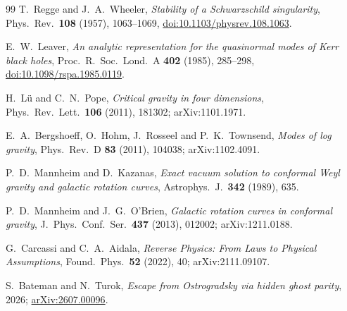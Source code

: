 \documentclass[11pt]{article}
\begin{document}
\begin{thebibliography}{99}
T.~Regge and J.~A.~Wheeler,
\emph{Stability of a Schwarzschild singularity},
Phys.\ Rev.\ \textbf{108} (1957), 1063--1069,
\href{https://doi.org/10.1103/physrev.108.1063}{doi:10.1103/physrev.108.1063}.

E.~W.~Leaver,
\emph{An analytic representation for the quasinormal modes of Kerr black
holes},
Proc.\ R.\ Soc.\ Lond.\ A \textbf{402} (1985), 285--298,
\href{https://doi.org/10.1098/rspa.1985.0119}{doi:10.1098/rspa.1985.0119}.

H.~L\"u and C.~N.~Pope,
\emph{Critical gravity in four dimensions},
Phys.\ Rev.\ Lett.\ \textbf{106} (2011), 181302; arXiv:1101.1971.

E.~A.~Bergshoeff, O.~Hohm, J.~Rosseel and P.~K.~Townsend,
\emph{Modes of log gravity},
Phys.\ Rev.\ D \textbf{83} (2011), 104038; arXiv:1102.4091.

P.~D.~Mannheim and D.~Kazanas,
\emph{Exact vacuum solution to conformal Weyl gravity and galactic rotation
curves}, Astrophys.\ J.\ \textbf{342} (1989), 635.

P.~D.~Mannheim and J.~G.~O'Brien,
\emph{Galactic rotation curves in conformal gravity},
J.\ Phys.\ Conf.\ Ser.\ \textbf{437} (2013), 012002; arXiv:1211.0188.

G.~Carcassi and C.~A.~Aidala,
\emph{Reverse Physics: From Laws to Physical Assumptions},
Found.\ Phys.\ \textbf{52} (2022), 40; arXiv:2111.09107.

S.~Bateman and N.~Turok,
\emph{Escape from Ostrogradsky via hidden ghost parity}, 2026;
\href{https://arxiv.org/abs/2607.00096}{arXiv:2607.00096}.

\end{thebibliography}
\end{document}
